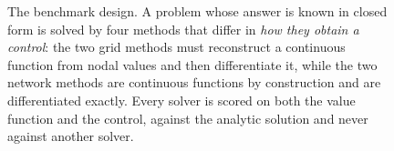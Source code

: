 \begin{figure}[t]
\caption{The benchmark design. A problem whose answer is known in closed form is solved by four
methods that differ in \emph{how they obtain a control}: the two grid methods must reconstruct a
continuous function from nodal values and then differentiate it, while the two network methods are
continuous functions by construction and are differentiated exactly. Every solver is scored on both
the value function and the control, against the analytic solution and never against another
solver.}
\label{fig:method}
\end{figure}

